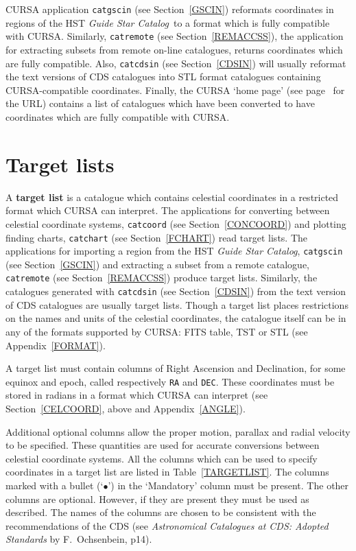 \documentclass[twoside,11pt]{article}
\newcommand{\htmladdnormallink}[2]{#1}
\newcommand{\xlabel}[1]{}
\renewcommand{\_}{\texttt{\symbol{95}}}
\begin{document}
CURSA application {\tt catgscin} (see Section~\ref{GSCIN}) reformats
coordinates in regions of the HST {\it Guide Star Catalog}\, to a
format which is fully compatible with CURSA.  Similarly, {\tt catremote}
(see Section~\ref{REMACCSS}), the application for extracting subsets
from remote on-line catalogues, returns coordinates which are fully
compatible.  Also, {\tt catcdsin} (see Section~\ref{CDSIN}) will
usually reformat the text versions of CDS catalogues into STL format
catalogues containing CURSA-compatible coordinates.  Finally, the CURSA 
`\htmladdnormallink{home page}{http://www.starlink.rl.ac.uk/cursa/}'
(see page~\pageref{HOMEPAGE} for the URL) contains a list of catalogues
which have been converted to have coordinates which are fully compatible
with CURSA.


\section{\xlabel{TARGLIST}\label{TARGLIST}Target lists}

A {\bf target list} is a catalogue which contains celestial coordinates
in a restricted format which CURSA can interpret.  The applications for
converting between celestial coordinate systems, {\tt catcoord} (see
Section~\ref{CONCOORD}) and plotting finding charts, {\tt catchart} (see
Section~\ref{FCHART}) read target lists.  The applications for
importing a region from the HST {\it Guide Star Catalog}, {\tt catgscin}
(see Section~\ref{GSCIN})
and extracting a subset from a remote catalogue, {\tt catremote} (see
Section~\ref{REMACCSS}) produce target lists.  Similarly, the catalogues
generated with {\tt catcdsin} (see Section~\ref{CDSIN}) from the text
version of CDS catalogues are usually target lists.  Though a target
list places restrictions on the names and units of the celestial
coordinates, the catalogue itself can be in any of the formats supported
by CURSA: FITS table, TST or STL (see Appendix~\ref{FORMAT}).

A target list must contain columns of Right Ascension and Declination,
for some equinox and epoch, called respectively {\tt RA} and {\tt DEC}.
These coordinates must be stored in radians in a format which CURSA can
interpret (see Section~\ref{CELCOORD}, above and Appendix~\ref{ANGLE}).

Additional optional columns allow the proper motion, parallax and radial
velocity to be specified.  These quantities are used for accurate
conversions between celestial coordinate systems.  All the columns which
can be used to specify coordinates in a target list are listed in
Table~\ref{TARGETLIST}.  The columns marked with a bullet (`$\bullet$')
in the `Mandatory' column must be present.  The other columns are
optional. However, if they are present they must be used as described.
The names of the columns are chosen to be consistent with the
recommendations of the CDS (see {\it Astronomical Catalogues at CDS:
Adopted Standards} by F.~Ochsenbein\cite{CDSTAND}, p14).
\end{document}
